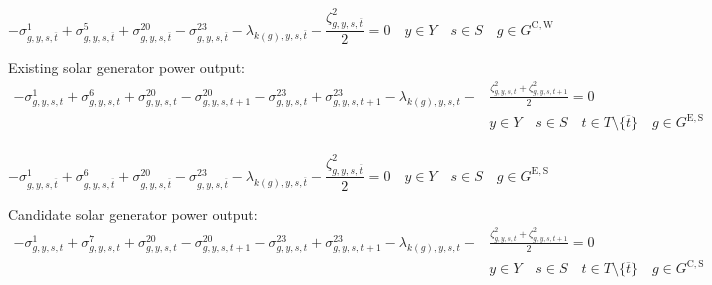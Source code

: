 \documentclass{article}
\newcommand{\sGeneratorsExistingSolar}{G^{\mathrm{E,S}}}
\newcommand{\sGeneratorsCandidateWind}{G^{\mathrm{C,W}}}
\newcommand{\sGeneratorsCandidateSolar}{G^{\mathrm{C,S}}}
\newcommand{\sYears}{Y}
\newcommand{\sScenarios}{S}
\newcommand{\sIntervals}{T}
\newcommand{\iGenerator}{g}
\newcommand{\iYear}{y}
\newcommand{\iScenario}{s}
\newcommand{\iInterval}{t}
\newcommand{\iIntervalTerminal}{\overline{\iInterval}}
\newcommand{\iZone}{z}
\newcommand{\dMinPowerOutput}[1][\iGenerator,\iYear,\iScenario,\iInterval]{\sigma_{#1}^{1}}
\newcommand{\dMaxPowerOutputWindCandidate}[1][\iGenerator,\iYear,\iScenario,\iInterval]{\sigma_{#1}^{5}}
\newcommand{\dMaxPowerOutputSolarExisting}[1][\iGenerator,\iYear,\iScenario,\iInterval]{\sigma_{#1}^{6}}
\newcommand{\dMaxPowerOutputSolarCandidate}[1][\iGenerator,\iYear,\iScenario,\iInterval]{\sigma_{#1}^{7}}
\newcommand{\dRampRateUp}[1][\iGenerator,\iYear,\iScenario,\iInterval]{\sigma_{#1}^{20}}
\newcommand{\dRampRateDown}[1][\iGenerator,\iYear,\iScenario,\iInterval]{\sigma_{#1}^{23}}
\newcommand{\dPowerBalance}[1][\iZone,\iYear,\iScenario,\iInterval]{\lambda_{#1}}
\newcommand{\dGeneratorEnergyOutput}[1][\iGenerator,\iYear,\iScenario,\iInterval]{\zeta_{#1}^{2}}
\begin{document}
\begin{equation}
-\dMinPowerOutput[\iGenerator,\iYear,\iScenario,\iIntervalTerminal] + \dMaxPowerOutputWindCandidate[\iGenerator,\iYear,\iScenario,\iIntervalTerminal] + \dRampRateUp[\iGenerator,\iYear,\iScenario,\iIntervalTerminal] - \dRampRateDown[\iGenerator,\iYear,\iScenario,\iIntervalTerminal] - \dPowerBalance[k(\iGenerator),\iYear,\iScenario,\iIntervalTerminal] - \frac{\dGeneratorEnergyOutput[\iGenerator,\iYear,\iScenario,\iIntervalTerminal]}{2} = 0 \quad \iYear \in \sYears \quad \iScenario \in \sScenarios \quad \iGenerator \in \sGeneratorsCandidateWind
\end{equation}

Existing solar generator power output:
\begin{align}
-\dMinPowerOutput + \dMaxPowerOutputSolarExisting + \dRampRateUp - \dRampRateUp[\iGenerator,\iYear,\iScenario,\iInterval+1] - \dRampRateDown + \dRampRateDown[\iGenerator,\iYear,\iScenario,\iInterval+1] - \dPowerBalance[k(\iGenerator),\iYear,\iScenario,\iInterval] - & \frac{\dGeneratorEnergyOutput + \dGeneratorEnergyOutput[\iGenerator,\iYear,\iScenario,\iInterval+1]}{2} = 0 \\\nonumber
& \iYear \in \sYears \quad \iScenario \in \sScenarios \quad \iInterval \in \sIntervals \setminus \{\iIntervalTerminal\} \quad \iGenerator \in \sGeneratorsExistingSolar\\\nonumber
\end{align}

\begin{equation}
-\dMinPowerOutput[\iGenerator,\iYear,\iScenario,\iIntervalTerminal] + \dMaxPowerOutputSolarExisting[\iGenerator,\iYear,\iScenario,\iIntervalTerminal] + \dRampRateUp[\iGenerator,\iYear,\iScenario,\iIntervalTerminal] - \dRampRateDown[\iGenerator,\iYear,\iScenario,\iIntervalTerminal] - \dPowerBalance[k(\iGenerator),\iYear,\iScenario,\iIntervalTerminal] - \frac{\dGeneratorEnergyOutput[\iGenerator,\iYear,\iScenario,\iIntervalTerminal]}{2} = 0 \quad \iYear \in \sYears \quad \iScenario \in \sScenarios \quad \iGenerator \in \sGeneratorsExistingSolar
\end{equation}

Candidate solar generator power output:
\begin{align}
-\dMinPowerOutput + \dMaxPowerOutputSolarCandidate + \dRampRateUp - \dRampRateUp[\iGenerator,\iYear,\iScenario,\iInterval+1] - \dRampRateDown + \dRampRateDown[\iGenerator,\iYear,\iScenario,\iInterval+1] - \dPowerBalance[k(\iGenerator),\iYear,\iScenario,\iInterval] - & \frac{\dGeneratorEnergyOutput + \dGeneratorEnergyOutput[\iGenerator,\iYear,\iScenario,\iInterval+1]}{2} = 0 \\\nonumber
& \iYear \in \sYears \quad \iScenario \in \sScenarios \quad \iInterval \in \sIntervals \setminus \{\iIntervalTerminal\} \quad \iGenerator \in \sGeneratorsCandidateSolar\\\nonumber
\end{align}
\end{document}
